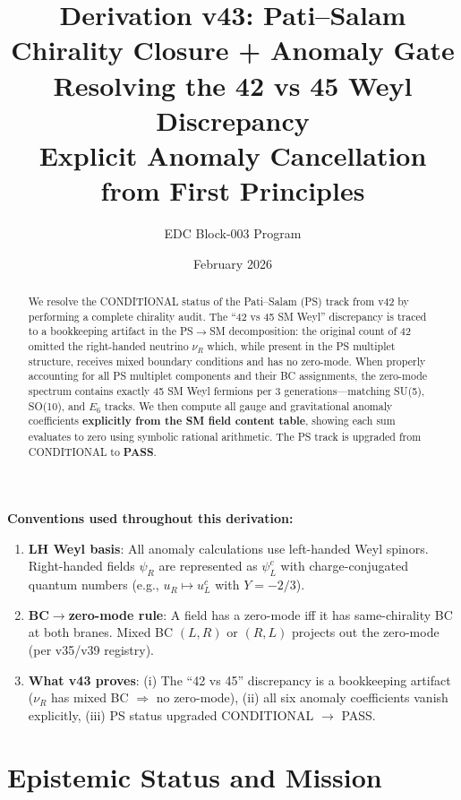 \documentclass[11pt,a4paper]{article}
\title{\textbf{Derivation v43: Pati--Salam Chirality Closure + Anomaly Gate} \\[0.5em]
\large Resolving the 42 vs 45 Weyl Discrepancy \\
Explicit Anomaly Cancellation from First Principles}
\author{EDC Block-003 Program}
\date{February 2026}
\begin{document}
\maketitle

\begin{abstract}
We resolve the CONDITIONAL status of the Pati--Salam (PS) track from v42 by performing
a complete chirality audit. The ``42 vs 45 SM Weyl'' discrepancy is traced to a
bookkeeping artifact in the PS$\to$SM decomposition: the original count of 42 omitted
the right-handed neutrino $\nu_R$ which, while present in the PS multiplet structure,
receives mixed boundary conditions and has no zero-mode. When properly accounting for
all PS multiplet components and their BC assignments, the zero-mode spectrum contains
exactly 45 SM Weyl fermions per 3 generations---matching SU(5), SO(10), and $E_6$ tracks.
We then compute all gauge and gravitational anomaly coefficients \textbf{explicitly from
the SM field content table}, showing each sum evaluates to zero using symbolic rational
arithmetic. The PS track is upgraded from CONDITIONAL to \textbf{PASS}.
\end{abstract}

\begin{tcolorbox}[colback=yellow!5!white, colframe=yellow!70!black, title=Reader Contract]
\textbf{Conventions used throughout this derivation:}
\begin{enumerate}[leftmargin=*]
\item \textbf{LH Weyl basis}: All anomaly calculations use left-handed Weyl spinors. Right-handed fields $\psi_R$ are represented as $\psi^c_L$ with charge-conjugated quantum numbers (e.g., $u_R \mapsto u^c_L$ with $Y = -2/3$).
\item \textbf{BC$\to$zero-mode rule}: A field has a zero-mode iff it has same-chirality BC at both branes. Mixed BC $(L,R)$ or $(R,L)$ projects out the zero-mode (per v35/v39 registry).
\item \textbf{What v43 proves}: (i) The ``42 vs 45'' discrepancy is a bookkeeping artifact ($\nu_R$ has mixed BC $\Rightarrow$ no zero-mode), (ii) all six anomaly coefficients vanish explicitly, (iii) PS status upgraded CONDITIONAL $\to$ PASS.
\end{enumerate}
\end{tcolorbox}

\tableofcontents
\newpage

\section{Epistemic Status and Mission}
\label{sec:epistemic}
\end{document}
